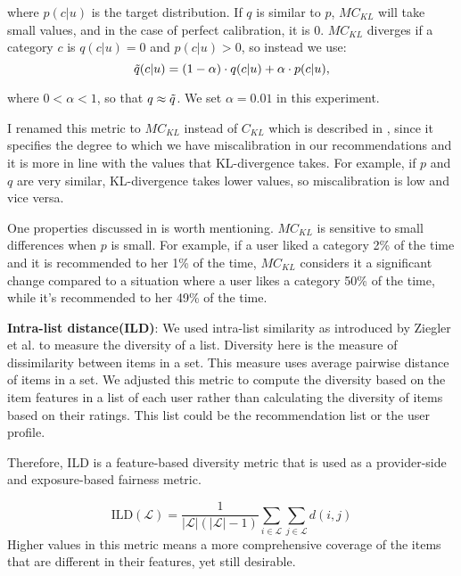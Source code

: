         where $p(c|u)$ is the target distribution. If $q$ is similar to $p$, $MC_{KL}$ will take small values, and in the case of perfect calibration, it is 0. $MC_{KL}$ diverges if a category $c$ is $q(c|u)=0$ and $p(c|u)>0$, so instead we use:
        \begin{equation}
            \Tilde{q}(c|u) = (1 - \alpha) \cdot q(c|u) + \alpha \cdot p(c|u),
        \end{equation}
        
        where $0 < \alpha < 1$, so that $q \approx \Tilde{q}$. We set $\alpha = 0.01$ in this experiment.
        
        I renamed this metric to $MC_{KL}$ instead of $C_{KL}$ which is described in \cite{steck2018calibrated}, since it specifies the degree to which we have miscalibration in our recommendations and it is more in line with the values that KL-divergence takes. For example, if $p$ and $q$ are very similar, KL-divergence takes lower values, so miscalibration is low and vice versa.
        
        One properties discussed in \cite{steck2018calibrated} is worth mentioning. $MC_{KL}$ is sensitive to small differences when $p$ is small. For example, if a user liked a category 2\% of the time and it is recommended to her 1\% of the time, $MC_{KL}$ considers it a significant change compared to a situation where a user likes a category 50\% of the time, while it's recommended to her 49\% of the time. 
    


        \textbf{Intra-list distance(ILD)}: We used intra-list similarity as introduced by Ziegler et al. \cite{ziegler2005improving} to measure the diversity of a list. Diversity here is the measure of dissimilarity between items in a set. This measure uses average pairwise distance of items in a set. We adjusted this metric to compute the diversity based on the item features in a list of each user rather than calculating the diversity of items based on their ratings. This list could be the recommendation list or the user profile.
        
        Therefore, ILD is a feature-based diversity metric that is used as a provider-side and exposure-based fairness metric.
        
        
        \begin{equation}
            \text{ILD}(\mathcal{L}) = \frac{1} {|\mathcal{L}|(|\mathcal{L}|-1)} \sum_{i \in \mathcal{L}}\sum_{j \in \mathcal{L}}d(i,j)
        \end{equation}
        Higher values in this metric means a more comprehensive coverage of the items that are different in their features, yet still desirable.



